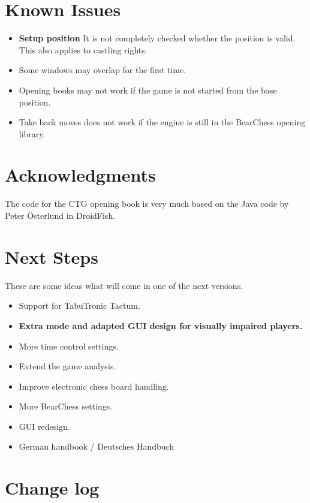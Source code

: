 \documentclass[11pt,a4paper]{article}
\begin{document}
\section{Known Issues}
\begin{itemize}
    \item \textbf{Setup position} It is not completely checked whether the position is valid. This also applies to castling rights.
	\item Some windows may overlap for the first time.	
	\item Opening books may not work if the game is not started from the base position.	
	\item Take back moves does not work if the engine is still in the BearChess opening library.
\end{itemize}

\section{Acknowledgments}
The code for the CTG opening book is very much based on the Java code by Peter Österlund in DroidFish.

\section{Next Steps}

These are some ideas what will come in one of the next versions.

\begin{itemize}		
	    \item Support for TabuTronic Tactum.
	    \item \textbf{Extra mode and adapted GUI design for visually impaired players.}
	    \item More time control settings.
		\item Extend the game analysis.
		\item Improve electronic chess board handling.  	    
    	\item More BearChess settings.
   		\item GUI redesign.
   		\item German handbook / Deutsches Handbuch
\end{itemize} 

\pagebreak

\listoffigures

\pagebreak

\section{Change log}
\end{document}
